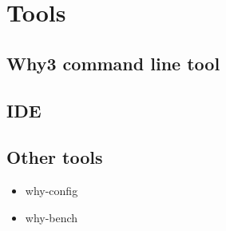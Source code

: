 \chapter{Tools}
\label{chap:tools}

\section{Why3 command line tool}

\section{IDE}

\section{Other tools}

\begin{itemize}
\item why-config
\item why-bench
\end{itemize}



